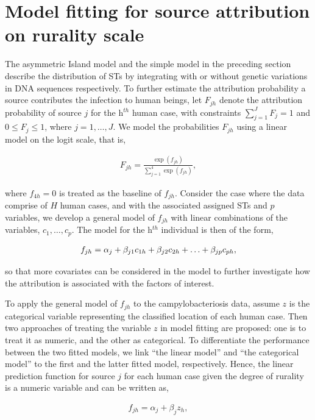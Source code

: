 \documentclass[times, doublespace]{simauth}%
\begin{document}
\section{Model fitting for source attribution on rurality scale}
The asymmetric Island model and the simple model in the preceding section describe the distribution of STs by integrating with or without genetic variations in DNA sequences respectively. To further estimate the attribution probability a source contributes the infection to human beings, let $F_{jh}$ denote the attribution probability of source $j$ for the h$^{th}$ human case, with constraints $\sum_{j=1}^J F_j =1$ and $0 \leq F_j \leq 1$, where $j=1, \ldots, J$. We model the probabilities $F_{jh}$ using a linear model on the logit scale, that is,  

\begin{align}
  F_{jh}  = \frac{\exp (f_{jh})}{\sum_{j=1}^4 \exp(f_{jh})},
  \label{capF}
\end{align}

where $f_{4h}=0$ is treated as the baseline of $f_{jh}$. Consider the case where the data comprise of $H$ human cases, and with the associated assigned STs and $p$ variables, we develop a general model of $f_{jh}$ with linear combinations of the variables, $c_1, \ldots, c_p$. The model for the h$^{th}$ individual is then of the form,

\begin{align}
f_{jh}  = \alpha_{j} + \beta_{j1} c_{1h} + \beta_{j2} c_{2h} + \ldots + \beta_{jp} c_{ph},  \notag  
\end{align}

so that more covariates can be considered in the model to further investigate how the attribution is associated with the factors of interest.

To apply the general model of $f_{jh}$ to the campylobacteriosis data, assume $z$ is the categorical variable representing the classified location of each human case. Then two approaches of treating the variable $z$ in model fitting are proposed: one is to treat it as numeric, and the other as categorical. To differentiate the performance between the two fitted models, we link ``the linear model'' and ``the categorical model'' to the first and the latter fitted model, respectively. Hence, the linear prediction function for source $j$ for each human case given the degree of rurality is a numeric variable and can be written as,

\begin{align}
  f_{jh} = \alpha_{j} + \beta_{j} z_{h},
  \label{modL}
\end{align}
\end{document}
